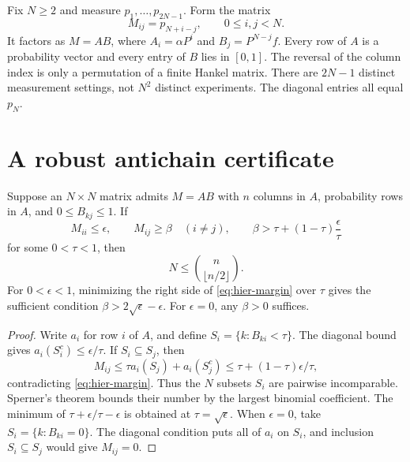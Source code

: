 Fix $N\ge2$ and measure $p_1,\ldots,p_{2N-1}$. Form the matrix
\begin{equation}
 M_{ij}=p_{N+i-j},\qquad 0\le i,j<N.
                                                        \label{eq:hier-matrix}
\end{equation}
It factors as $M=AB$, where $A_i=\alpha P^i$ and $B_j=P^{N-j}f$.
Every row of $A$ is a probability vector and every entry of $B$ lies in $[0,1]$.
The reversal of the column index is only a permutation of a finite Hankel
matrix. There are $2N-1$ distinct measurement settings, not $N^2$ distinct
experiments. The diagonal entries all equal $p_N$.

\section{A robust antichain certificate}
\begin{theorem}
\label{thm:robust-antichain}
Suppose an $N\times N$ matrix admits $M=AB$ with $n$ columns in $A$,
probability rows in $A$, and $0\le B_{kj}\le1$. If
\begin{equation}
 M_{ii}\le\epsilon,\qquad M_{ij}\ge\beta\quad(i\ne j),
 \qquad
 \beta>\tau+(1-\tau)\frac{\epsilon}{\tau}
                                                        \label{eq:hier-margin}
\end{equation}
for some $0<\tau<1$, then
\begin{equation}
 N\le {n\choose\lfloor n/2\rfloor}.                     \label{eq:hier-sperner}
\end{equation}
For $0<\epsilon<1$, minimizing the right side of
\eqref{eq:hier-margin} over $\tau$ gives the sufficient condition
$\beta>2\sqrt\epsilon-\epsilon$. For $\epsilon=0$, any $\beta>0$
suffices.
\end{theorem}
\begin{proof}
Write $a_i$ for row $i$ of $A$, and define
$S_i=\{k:B_{ki}<\tau\}$. The diagonal bound gives
$a_i(S_i^c)\le\epsilon/\tau$. If $S_i\subseteq S_j$, then
\[
 M_{ij}\le\tau a_i(S_j)+a_i(S_j^c)
 \le\tau+(1-\tau)\epsilon/\tau,
\]
contradicting \eqref{eq:hier-margin}. Thus the $N$ subsets $S_i$ are pairwise
incomparable. Sperner's theorem bounds their number by the largest binomial
coefficient. The minimum of $\tau+\epsilon/\tau-\epsilon$ is obtained at
$\tau=\sqrt\epsilon$. When $\epsilon=0$, take $S_i=\{k:B_{ki}=0\}$.
The diagonal condition puts all of $a_i$ on $S_i$, and inclusion
$S_i\subseteq S_j$ would give $M_{ij}=0$.
\end{proof}

